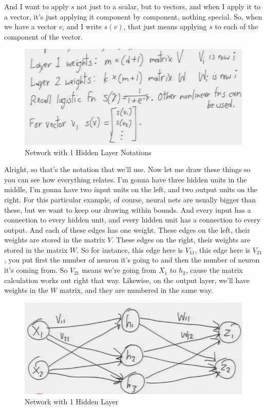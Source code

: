 \documentclass[fleqn,10pt]{olplainarticle}
\theoremstyle{definition}
\theoremstyle{remark}
\begin{document}
And I want to apply $s$ not just to a scalar, but to vectors, and when I apply it to a vector, it's just applying it component by component, nothing special. So, when we have a vector $v$, and I write $s(v)$, that just means applying $s$ to each of the component of the vector. 
\begin{figure}[ht]
\centering
\includegraphics[width=0.7\linewidth]{images/nn_with_1_hidden_layer_notation}
\caption{Network with 1 Hidden Layer Notations}
\label{fig:nn_with_1_hidden_layer_notations}
\end{figure}

Alright, so that's the notation that we'll use. Now let me draw these things so you can see how everything relates. I'm gonna have three hidden units in the middle, I'm gonna have two input units on the left, and two output units on the right. For this particular example, of course, neural nets are usually bigger than these, but we want to keep our drawing within bounds. And every input has a connection to every hidden unit, and every hidden unit has a connection to every output. And each of these edges has one weight. These edges on the left, their weights are stored in the matrix $V$. These edges on the right, their weights are stored in the matrix $W$. So for instance, this edge here is $V_{11}$, this edge here is $V_{21}$, you put first the number of neuron it's going to and then the number of neuron it's coming from. So $V_{21}$ means we're going from $X_1$ to $h_2$, cause the matrix calculation works out right that way. Likewise, on the output layer, we'll have weights in the $W$ matrix, and they are numbered in the same way.
\clearpage

\begin{figure}[ht]
\centering
\includegraphics[width=0.7\linewidth]{images/nn_1_layer_diagram}
\caption{Network with 1 Hidden Layer}
\label{fig:nn_1_layer_diagram}
\end{figure}
\end{document}

